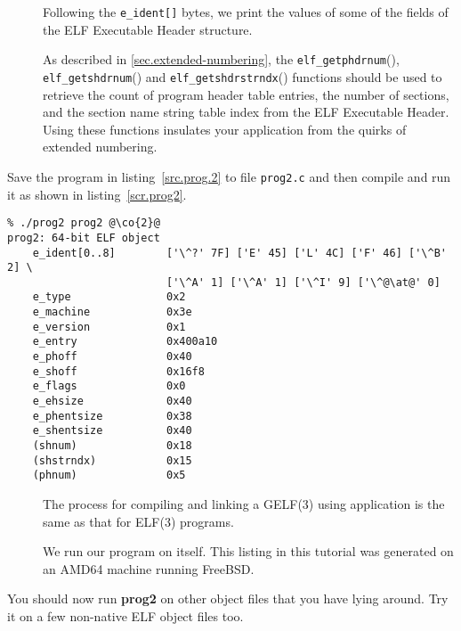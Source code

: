 \documentclass[a4paper]{book}
\makeatletter
\newcommand{\function}[1]{\texttt{#1}()}
\newcommand{\filename}[1]{\texttt{#1}}
\newcommand{\parameter}[1]{\texttt{#1}}
\newcommand{\tool}[1]{\textbf{#1}}
\newcommand{\trade}{\texttrademark\xspace}
\newenvironment{callout}[2][blue]{%
  \begingroup\newcommand{\@cocolor}{#1}%
  \newcommand{\@cogroup}[1]{#2}}{\endgroup}
\newcommand{\@co}[1]{\framebox{\textbf{\color{\@cocolor}#1}}}
\newcommand{\co}[1]{%
  \hypertarget{\@cogroup.#1.co}{%
    \hyperlink{\@cogroup.#1.cr}{\@co{#1}}}}
\newcommand{\coref}[1]{%
  \hypertarget{\@cogroup.#1.cr}{%
    \hyperlink{\@cogroup.#1.co}{\@co{#1}}}}
\makeatother
\begin{document}
\begin{callout}{prog2}
\begin{description}
  \item[\coref{6}] Following the \parameter{e\_ident[]} bytes, we
    print the values of some of the fields of the ELF Executable
    Header structure.

  \item[\coref{7} \coref{8} \coref{9}] As described in
    \vref{sec.extended-numbering}, the \function{elf\_getphdrnum},
    \function{elf\_getshdrnum} and \function{elf\_getshdrstrndx}
    functions should be used to retrieve the count of program header
    table entries, the number of sections, and the section name string
    table index from the ELF Executable Header.  Using these functions
    insulates your application from the quirks of extended numbering.
  \end{description}
\end{callout}

Save the program in listing~\vref{src.prog.2} to file \filename{prog2.c} and
then compile and run it as shown in listing~\vref{scr.prog2}.

\begin{callout}[red]{scr2}
  \newcommand{\at}{@}
  \begin{lstlisting}[language={}, basicstyle=\small\ttfamily,
      label=scr.prog2, caption=Compiling and Running prog2]
% cc -o prog2 prog2.c -lelf @\co{1}@
% ./prog2 prog2 @\co{2}@
prog2: 64-bit ELF object
    e_ident[0..8]        ['\^?' 7F] ['E' 45] ['L' 4C] ['F' 46] ['\^B' 2] \
                         ['\^A' 1] ['\^A' 1] ['\^I' 9] ['\^@\at@' 0]
    e_type               0x2
    e_machine            0x3e
    e_version            0x1
    e_entry              0x400a10
    e_phoff              0x40
    e_shoff              0x16f8
    e_flags              0x0
    e_ehsize             0x40
    e_phentsize          0x38
    e_shentsize          0x40
    (shnum)              0x18
    (shstrndx)           0x15
    (phnum)              0x5
  \end{lstlisting}
  \begin{description}
  \item[\coref{1}] The process for compiling and linking a GELF(3)
    using application is the same as that for ELF(3) programs.

  \item[\coref{2}] We run our program on itself.  This listing in this
    tutorial was generated on an AMD64\trade machine running FreeBSD.
  \end{description}

  You should now run \tool{prog2} on other object files that you have
  lying around.  Try it on a few non-native ELF object files too.
\end{callout}
\end{document}
